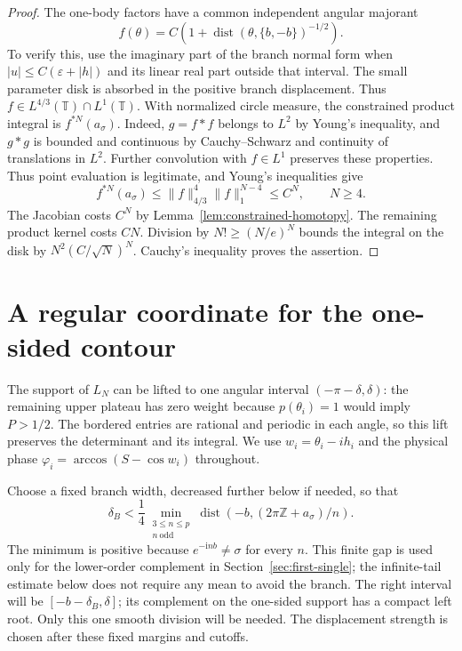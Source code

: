 \documentclass[11pt]{article}
\numberwithin{equation}{section}
\theoremstyle{remark}\newtheorem{remark}[theorem]{Remark}
\newcommand{\ii}{\mathrm i}
\begin{document}
\begin{proof}
The one-body factors have a common independent angular majorant
\[
 f(\theta)=C\left(1+
  \operatorname{dist}(\theta,\{b,-b\})^{-1/2}\right).
\]
To verify this, use the imaginary part of the branch normal form
when $|u|\le C(\varepsilon+|h|)$ and its linear real part outside
that interval.  The small parameter disk is absorbed in the positive
branch displacement.  Thus $f\in L^{4/3}(\mathbb T)\cap L^1(\mathbb T)$.
With normalized circle measure, the constrained product integral is
$f^{*N}(a_\sigma)$.  Indeed, $g=f*f$ belongs to $L^2$ by Young's
inequality, and $g*g$ is bounded and continuous by
Cauchy--Schwarz and continuity of translations in $L^2$.
Further convolution with $f\in L^1$ preserves these properties.
Thus point evaluation is legitimate, and Young's inequalities give
\[
 f^{*N}(a_\sigma)\le \|f\|_{4/3}^{4}\|f\|_1^{N-4}\le C^N,
 \qquad N\ge4.
\]
The Jacobian costs $C^N$ by Lemma~\ref{lem:constrained-homotopy}.
The remaining product kernel costs $CN$.  Division by
$N!\ge(N/e)^N$ bounds the integral on the disk by
$N^2(C/\sqrt N)^N$.  Cauchy's inequality proves the assertion.
\end{proof}

\section{A regular coordinate for the one-sided contour}\label{sec:global-coordinate}


The support of $L_N$ can be lifted to one angular interval
$(-\pi-\delta,\delta)$: the remaining upper plateau has zero
weight because $p(\theta_i)=1$ would imply $P>1/2$.
The bordered entries are rational and periodic in each angle,
so this lift preserves the determinant and its integral.
We use $w_i=\theta_i-ih_i$ and the physical phase
$\varphi_i=\arccos(S-\cos w_i)$ throughout.

Choose a fixed branch width, decreased further below if needed, so that
\begin{equation}\label{eq:finite-mean-exclusion}
 \delta_B<\frac14\min_{\substack{3\le n\le p\\n\ \mathrm{odd}}}
       \operatorname{dist}(-b,(2\pi\mathbb Z+a_\sigma)/n).
\end{equation}
The minimum is positive because $e^{-\ii nb}\ne\sigma$ for every $n$.
This finite gap is used only for the lower-order complement in
Section~\ref{sec:first-single}; the infinite-tail estimate below
does not require any mean to avoid the branch.
The right interval will be $[-b-\delta_B,\delta]$; its
complement on the one-sided support has a compact left root.
Only this one smooth division will be needed. The displacement
strength is chosen after these fixed margins and cutoffs.
\end{document}

